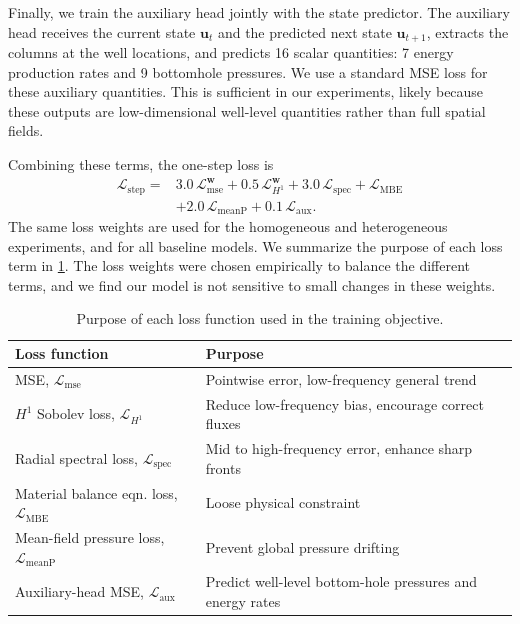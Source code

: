 \documentclass[pdflatex,sn-mathphys-ay]{sn-jnl}
\newcommand{\svec}{\mathbf{u}}            %
\begin{document}
Finally, we train the auxiliary head jointly with the state predictor. The
auxiliary head receives the current state \(\svec_t\) and the predicted next
state \(\hat{\svec}_{t+1}\), extracts the columns at the well locations, and
predicts 16 scalar quantities: 7 energy production rates and 9 bottomhole
pressures. We use a standard MSE loss for these auxiliary quantities. This is
sufficient in our experiments, likely because these outputs are low-dimensional
well-level quantities rather than full spatial fields.

Combining these terms, the one-step loss is
\begin{equation}
\begin{aligned}
  \mathcal{L}_{\mathrm{step}}
  ={}&
  3.0\,\mathcal{L}_{\mathrm{mse}}^{\mathbf{w}}
  + 0.5\,\mathcal{L}_{H^1}^{\mathbf{w}}
  + 3.0\,\mathcal{L}_{\mathrm{spec}}
  + \mathcal{L}_{\mathrm{MBE}}  \\
  &+ 2.0\,\mathcal{L}_{\mathrm{meanP}}
  + 0.1\,\mathcal{L}_{\mathrm{aux}} .
\end{aligned}
\label{eq:step-loss}
\end{equation}
The same loss weights are used for the homogeneous and heterogeneous
experiments, and for all baseline models. We summarize the purpose of each loss term
in \cref{tab:loss-purpose}. The loss weights were chosen empirically to balance the
different terms, and we find our model is not sensitive to small changes in these weights.

\begin{table}[t]
  \centering
  \caption{Purpose of each loss function used in the training objective.}
  \label{tab:loss-purpose}
  \begin{tabular}{@{}lp{}@{}}
    \toprule
    Loss function & Purpose \\
    \midrule
    MSE, \(\mathcal{L}_{\mathrm{mse}}\) & Pointwise error, low-frequency general trend \\
    \(H^1\) Sobolev loss, \(\mathcal{L}_{H^1}\) & Reduce low-frequency bias, encourage correct fluxes\\
    Radial spectral loss, \(\mathcal{L}_{\mathrm{spec}}\) & Mid to high-frequency error, enhance sharp fronts \\
    Material balance eqn. loss, \(\mathcal{L}_{\mathrm{MBE}}\) & Loose physical constraint \\
    Mean-field pressure loss, \(\mathcal{L}_{\mathrm{meanP}}\) & Prevent global pressure drifting\\
    Auxiliary-head MSE, \(\mathcal{L}_{\mathrm{aux}}\) & Predict well-level bottom-hole pressures and energy rates\\
    \bottomrule
  \end{tabular}
\end{table}
\end{document}
